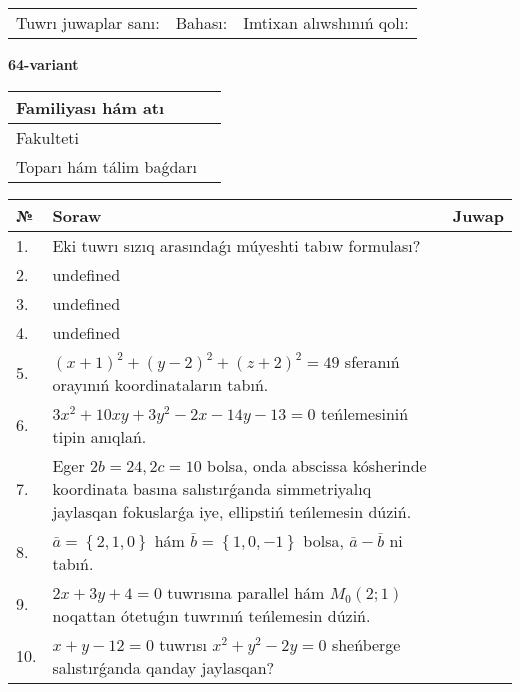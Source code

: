 \documentclass{article}
\begin{document}
\vspace{0.7cm}

\begin{tabular}{lll}
Tuwrı juwaplar sanı: \underline{\hspace{1cm}} & 
Bahası: \underline{\hspace{1cm}} & 
Imtixan alıwshınıń qolı: \underline{\hspace{2cm}} \\
\end{tabular}

\egroup

\newpage


\textbf{64-variant}\\

\bgroup
\def\arraystretch{1.6} %

\begin{tabular}{|m{5.7cm}|m{9.5cm}|}
\hline
Familiyası hám atı & \\
\hline
Fakulteti  & \\
\hline
Toparı hám tálim baǵdarı  & \\
\hline
\end{tabular}

\vspace{0.7cm}

\begin{tabular}{|m{0.7cm}|m{10cm}|m{4cm}|}
\hline
№ & Soraw & Juwap \\
\hline
1. & Eki tuwrı sızıq arasındaǵı múyeshti tabıw formulası? &  \\
\hline
2. & undefined &  \\
\hline
3. & undefined &  \\
\hline
4. & undefined &  \\
\hline
5. & \((x + 1) ^{2} + (y - 2) ^{2} + (z + 2) ^{2} = 49\) sferanıń orayınıń koordinataların tabıń. &  \\
\hline
6. & \(3 x^{2} + 10 xy + 3 y^{2} - 2 x - 14 y - 13 = 0\) teńlemesiniń tipin anıqlań. &  \\
\hline
7. & Eger \(2 b = 24, 2 c = 10\) bolsa, onda abscissa kósherinde koordinata basına salıstırǵanda simmetriyalıq jaylasqan fokuslarǵa iye, ellipstiń teńlemesin dúziń. &  \\
\hline
8. & \(\bar{a} = \left\{ 2, 1, 0 \right\}\) hám \(\bar{b} = \left\{ 1, 0,- 1 \right\}\) bolsa, \(\bar{a} - \bar{b}\) ni tabıń. &  \\
\hline
9. & \(2 x + 3 y + 4 = 0\) tuwrısına parallel hám \(M_{0} (2;1)\) noqattan ótetuǵın tuwrınıń teńlemesin dúziń. &  \\
\hline
10. & \(x + y - 12 = 0\) tuwrısı \(x^{2} + y^{2} - 2 y = 0\) sheńberge salıstırǵanda qanday jaylasqan? & \\
\hline
\end{tabular}
\end{document}
